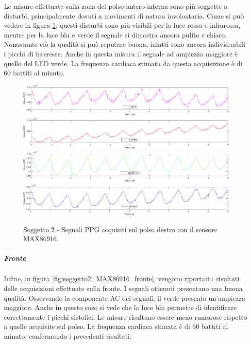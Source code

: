 Le misure effettuate sulla zona del polso antero-interna sono più soggette a disturbi, principalmente dovuti a movimenti di natura involontaria. Come si può vedere in figura \ref{fig:soggetto2_MAX86916_polso}, questi disturbi sono più visibili per la luce rossa e infrarossa, mentre per la luce blu e verde il segnale si dimostra ancora pulito e chiaro. Nonostante ciò la qualità si può reputare buona, infatti sono ancora individuabili i picchi di interesse. Anche in questa misura il segnale ad ampiezza maggiore è quello del LED verde. La frequenza cardiaca stimata da questa acquisizione è di 60 battiti al minuto.
\begin{figure}[h]
	\centering
	\includegraphics[width=1\linewidth]{ImageFiles/Misure Preliminari/Soggetto 2/max86916/polso_inferiore_ired}
	\includegraphics[width=1\linewidth]{ImageFiles/Misure Preliminari/Soggetto 2/max86916/polso_inferiore_red}
	\includegraphics[width=1\linewidth]{ImageFiles/Misure Preliminari/Soggetto 2/max86916/polso_inferiore_green}
	\includegraphics[width=1\linewidth]{ImageFiles/Misure Preliminari/Soggetto 2/max86916/polso_inferiore_blu}
	\caption{Soggetto 2 - Segnali PPG acquisiti sul polso destro con il sensore MAX86916.}
	\label{fig:soggetto2_MAX86916_polso}
\end{figure}

\clearpage

\subparagraph{Fronte}
Infine, in figura \ref{fig:soggetto2_MAX86916_fronte}, vengono riportati i risultati delle acquisizioni effettuate sulla fronte. I segnali ottenuti presentano una buona qualità. Osservando la componente AC dei segnali, il verde presenta un'ampiezza maggiore. Anche in questo caso si vede che la luce blu permette di identificare correttamente i picchi sistolici. Le misure risultano essere meno rumorose rispetto a quelle acquisite sul polso. La frequenza cardiaca stimata è di 60 battiti al minuto, confermando i precedenti risultati.


